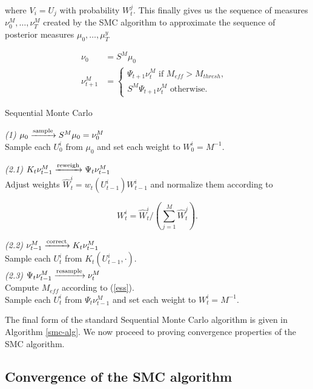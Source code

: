 where $V_i = U_j$ with probability $W^j_t$. This finally gives us the sequence of measures $\nu^M_0, \ldots, \nu^M_T$ created by the SMC algorithm to approximate the sequence of posterior measures $\mu_0, \ldots, \mu^y_T$

\begin{align*}
  \nu_0 &= S^M\mu_0\\
  \nu_{t+1}^M &= \begin{cases}
    \Psi_{t+1}\nu^M_t\text{\ \ \ \ \ \ \ \ if $M_{eff} > M_{thresh},$ }\\
    S^M\Psi_{t+1}\nu^M_t\text{\ \ \ \ otherwise. }
  \end{cases}
\end{align*}


\begin{algorithm}[t!]
  \caption{Sequential Monte Carlo}
  \label{smc-alg}
  \textit{(1) $\mu_0 \xrightarrow{\text{sample}} S^M\mu_0 = \nu^M_0$}\\
  Sample each $U^i_0$ from $\mu_0$ and
  set each weight to $W^i_0 = M^{-1}$. \\
  \;
   {
    \textit{(2.1) $K_t\nu^M_{t-1}\xrightarrow{\text{reweigh}} \Psi_t\nu^M_{t-1}$}\\
    Adjust weights $\hat W^i_t = w_t(U^i_{t-1})W^i_{t-1}$ and normalize them according to

    \begin{equation*}
      W^i_t = \hat W^i_t \Big/ \left(\sum_{j=1}^M\hat W_t^j\right).
    \end{equation*}
    
    \textit{(2.2) $\nu^M_{t-1} \xrightarrow{\text{correct}} K_t\nu^M_{t-1}$ }\\
    Sample each $U^i_t$ from $K_t(U^i_{t-1}, \cdot)$.\\
    \;
    \textit{(2.3) $\Psi_t\nu^M_{t-1} \xrightarrow{\text{resample}} \nu^M_t$}\\
    Compute $M_{eff}$ according to (\ref{ess}).\\
     {
      Sample each $U^i_t$ from $\Psi_t\nu^M_{t-1}$ and set each weight to $W^i_t = M^{-1}$.
    }
  }
\end{algorithm}

The final form of the standard Sequential Monte Carlo algorithm is given in Algorithm \ref{smc-alg}. We now proceed to proving convergence properties of the SMC algorithm.

\subsection{Convergence of the SMC algorithm}


